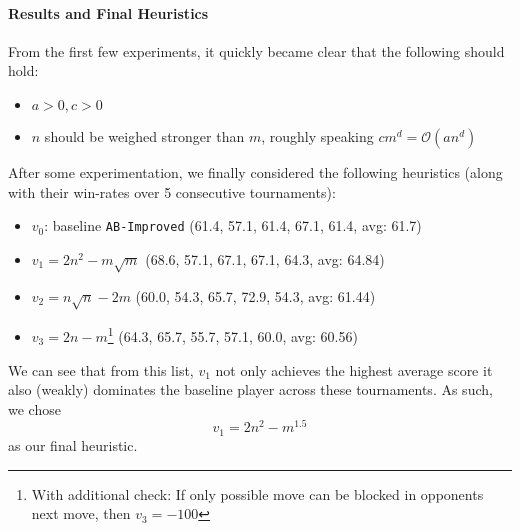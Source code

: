 \documentclass{article}
\theoremstyle{plain}
\theoremstyle{definition}
\theoremstyle{remark}
\begin{document}
\paragraph{Results and Final Heuristics}

From the first few experiments, it quickly became clear that the following should hold:
\begin{itemize}
	\item $a>0, c>0$
	\item $n$ should be weighed stronger than $m$, roughly speaking $cm^d = \mathcal O(an^d)$
\end{itemize}

After some experimentation, we finally considered the following heuristics (along with their win-rates over 5 consecutive tournaments):
\begin{itemize}
	\item $v_0$: baseline \texttt{AB-Improved} \quad(61.4, 57.1, 61.4, 67.1, 61.4, avg: 61.7) 
	\item $v_1 = 2n^2 - m\sqrt m$ \qquad (68.6, 57.1, 67.1, 67.1, 64.3, avg: 64.84)
	\item $v_2 = n\sqrt n - 2m$ \quad (60.0, 54.3, 65.7, 72.9, 54.3, avg: 61.44)
	\item $v_3 = 2n - m$\footnote{With additional check: If only possible move can be blocked in opponents next move, then $v_3=-100$} (64.3, 65.7, 55.7, 57.1, 60.0,  avg: 60.56)
\end{itemize}

We can see that from this list, $v_1$ not only achieves the highest average score \textemdash it also (weakly) dominates the baseline player across these tournaments. As such, we chose
$$ v_1 = 2n^2 - m^{1.5}$$ as our final heuristic.

% 
\end{document}
